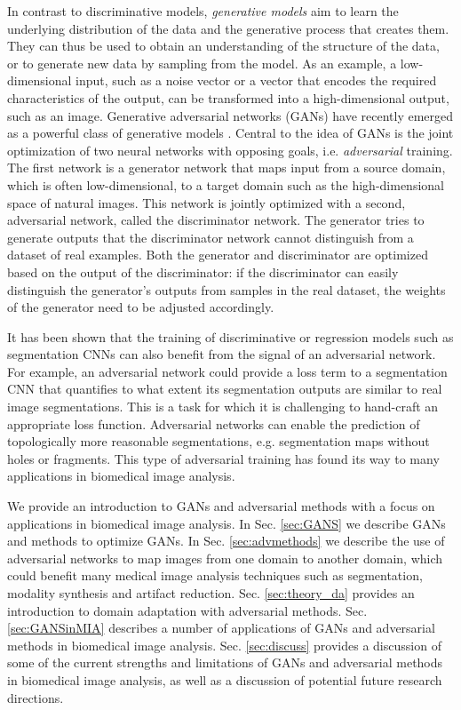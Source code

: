 \documentclass{article}
\begin{document}
In contrast to discriminative models, \textit{generative models} aim to learn the underlying distribution of the data and the generative process that creates them. They can thus be used to obtain an understanding of the structure of the data, or to generate new data by sampling from the model. As an example, a low-dimensional input, such as a noise vector or a vector that encodes the required characteristics of the output, can be transformed into a high-dimensional output, such as an image. Generative adversarial networks (GANs) have recently emerged as a powerful class of generative models \cite{Good14}. Central to the idea of GANs is the joint optimization of two neural networks with opposing goals, i.e. \textit{adversarial} training. The first network is a generator network that maps input from a source domain, which is often low-dimensional, to a target domain such as the high-dimensional space of natural images. This network is jointly optimized with a second, adversarial network, called the discriminator network. The generator tries to generate outputs that the discriminator network cannot distinguish from a dataset of real examples. Both the generator and discriminator are optimized based on the output of the discriminator: if the discriminator can easily distinguish the generator's outputs from samples in the real dataset, the weights of the generator need to be adjusted accordingly.

It has been shown that the training of discriminative or regression models such as segmentation CNNs can also benefit from the signal of an adversarial network. For example, an adversarial network could provide a loss term to a segmentation CNN that quantifies to what extent its segmentation outputs are similar to real image segmentations. 
This is a task for which it is challenging to hand-craft an appropriate loss function. Adversarial networks can enable the prediction of topologically more reasonable segmentations, e.g. segmentation maps without holes or fragments.
This type of adversarial training has found its way to many applications in biomedical image analysis. 

We provide an introduction to GANs and adversarial methods with a focus on applications in biomedical image analysis. In Sec. \ref{sec:GANS} we describe GANs and methods to optimize GANs. In Sec. \ref{sec:advmethods} we describe the use of adversarial networks to map images from one domain to another domain, which could benefit many medical image analysis techniques such as segmentation, modality synthesis and artifact reduction. Sec. \ref{sec:theory_da} provides an introduction to domain adaptation with adversarial methods. Sec. \ref{sec:GANSinMIA} describes a number of applications of GANs and adversarial methods in biomedical image analysis. Sec. \ref{sec:discuss} provides a discussion of some of the current strengths and limitations of GANs and adversarial methods in biomedical image analysis, as well as a discussion of potential future research directions.
\end{document}
